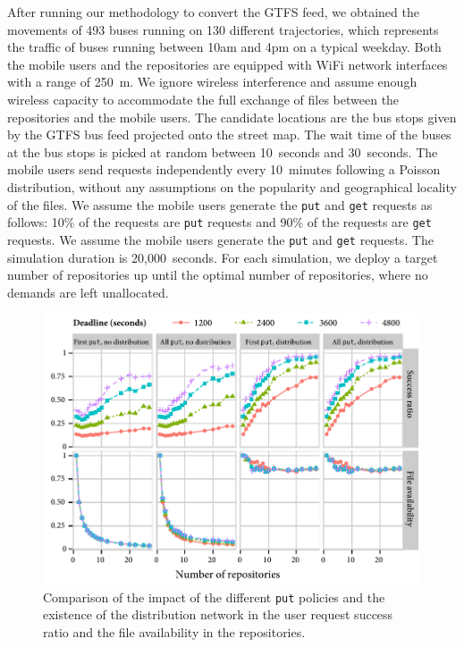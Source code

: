 After running our methodology to convert the GTFS feed, we obtained the movements of 493 buses running on 130 different trajectories, which represents the traffic of buses running between 10am and 4pm on a typical weekday. Both the mobile users and the repositories are equipped with WiFi network interfaces with a range of 250~m. We ignore wireless interference and assume enough wireless capacity to accommodate the full exchange of files between the repositories and the mobile users. The candidate locations are the bus stops given by the GTFS bus feed projected onto the street map. The wait time of the buses at the bus stops is picked at random between 10~seconds and 30~seconds. The mobile users send requests independently every 10~minutes following a Poisson distribution, without any assumptions on the popularity and geographical locality of the files. We assume the mobile users generate the \texttt{put} and \texttt{get} requests as follows: 10\% of the requests are \texttt{put} requests and 90\% of the requests are \texttt{get} requests. We assume the mobile users generate the \texttt{put} and \texttt{get} requests. The simulation duration is 20,000~seconds. For each simulation, we deploy a target number of repositories up until the optimal number of repositories, where no demands are left unallocated. 

\begin{figure}[t]
    \centering
    \includegraphics[width=0.8\linewidth]{figures/successRatio-fileAvailability.pdf}
    \caption{Comparison of the impact of the different \texttt{put} policies and the existence of the distribution network in the user request success ratio and the file availability in the repositories.}
    \label{fig:baseline1}
\end{figure}

